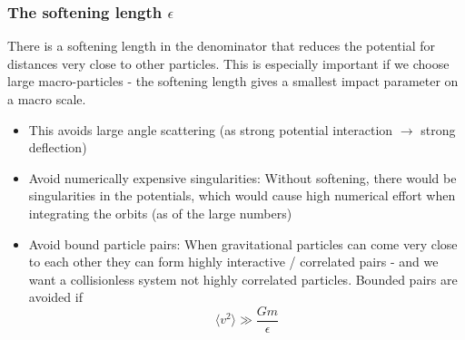 \subsubsection{The softening length $\epsilon$}
There is a softening length in 
the denominator \textcolor{blue1}{that reduces the 
potential for distances very close 
to other particles}. This is especially 
important if we choose large 
macro-particles - the softening 
length gives a smallest impact parameter 
on a macro scale.

\begin{itemize}
    \item This avoids large angle scattering (as strong potential interaction $\rightarrow$ strong deflection)
    \item \textcolor{green1}{Avoid numerically expensive singularities}: Without softening, there would be singularities in the potentials, which would cause high numerical effort when integrating the orbits (as of the large numbers)
    \item \textcolor{green1}{Avoid bound particle pairs}: When gravitational particles can come very close to each other they can form highly interactive / correlated pairs - and we want a collisionless system not highly correlated particles.
    Bounded pairs are avoided if
    \begin{equation}
        \langle v^2 \rangle \gg \frac{Gm}{\epsilon}
    \end{equation}
\end{itemize}



\pagebreak